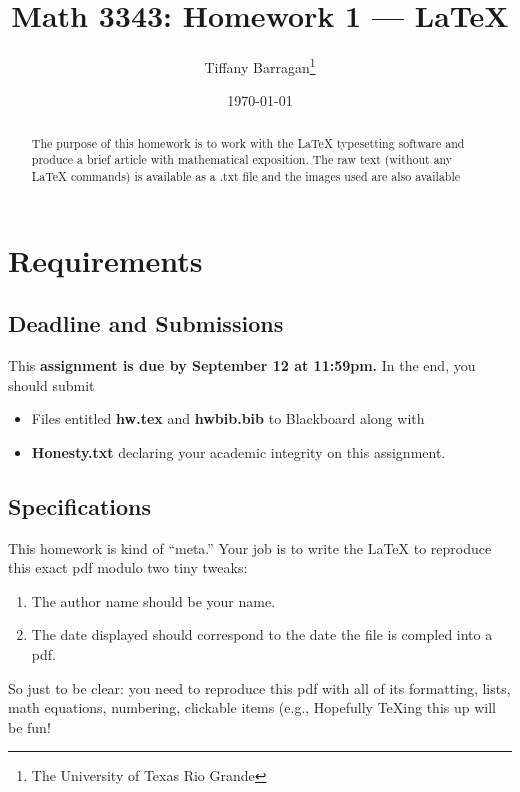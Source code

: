 \documentclass[12pt]{article}
\title{Math 3343: Homework 1 — LaTeX}
\date{\today}
\author{Tiffany Barragan\thanks{The University of Texas Rio Grande}}
\begin{document}
\maketitle

\tableofcontents

\begin{abstract}
    
The purpose of this homework is to work with the LaTeX typesetting software and produce a brief article with mathematical exposition.
The raw text (without any LaTeX commands) is available as a .txt
file and the images used are also available
\end{abstract}

\section{Requirements}
\subsection{Deadline and Submissions}
This \textbf{assignment is due by September 12 at 11:59pm.} In the
end, you should submit

\begin{itemize}
   
\item{Files entitled \textbf{hw.tex} and \textbf{hwbib.bib} to Blackboard along with}

\item{\textbf{Honesty.txt} declaring your academic integrity on this assignment.}

\end{itemize}

\subsection{Specifications}
This homework is kind of “meta.” Your job is to write the LaTeX to
reproduce this exact pdf modulo two tiny tweaks:

\begin{enumerate}

\item{The author name should be your name.}

\item{The date displayed should correspond to the date the file is compled into a pdf.}

\end{enumerate}


So just to be clear: you need to reproduce this pdf with all of
its formatting, lists, math equations, numbering, clickable items (e.g.,
\newline
\newline
Hopefully TeXing this up will be fun!
\end{document}
